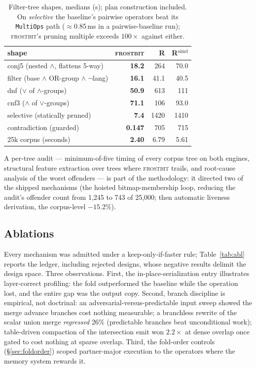 \documentclass[sigconf,nonacm]{acmart}
\newcommand{\fb}{\textsc{frostbit}}
\begin{document}
\begin{table}[t]
\caption{Filter-tree shapes, medians (\textmu s); plan construction
included. On \emph{selective} the baseline's pairwise operators beat
its \texttt{MultiOps} path ($\approx$0.85\,ms in a pairwise-baseline
run); \fb's pruning multiple exceeds $100\times$ against either.}
\label{tab:trees}
\small
\begin{tabular}{lrrr}
\toprule
shape & \fb & R & R$^{\text{simd}}$ \\
\midrule
conj5 (nested $\wedge$, flattens 5-way) & \textbf{18.2} & 264 & 70.0 \\
filter (base $\wedge$ OR-group $\wedge$ $\neg$lang) & \textbf{16.1} & 41.1 & 40.5 \\
dnf ($\vee$ of $\wedge$-groups) & \textbf{50.9} & 613 & 111 \\
cnf3 ($\wedge$ of $\vee$-groups) & \textbf{71.1} & 106 & 93.0 \\
selective (statically pruned) & \textbf{7.4} & 1420 & 1410 \\
contradiction (guarded) & \textbf{0.147} & 705 & 715 \\
25k corpus (seconds) & \textbf{2.40} & 6.79 & 5.61 \\
\bottomrule
\end{tabular}
\end{table}

A per-tree audit --- minimum-of-five timing of every corpus tree on both
engines, structural feature extraction over trees where \fb{} trails,
and root-cause analysis of the worst offenders --- is part of the
methodology: it directed two of the shipped mechanisms (the hoisted
bitmap-membership loop, reducing the audit's offender count from 1{,}245
to 743 of 25{,}000; then automatic liveness derivation, the corpus-level
$-15.2\%$).

\subsection{Ablations}
\label{sec:eval:abl}

Every mechanism was admitted under a keep-only-if-faster rule;
Table~\ref{tab:abl} reports the ledger, including rejected designs,
whose negative results delimit the design space. Three observations.
First, the in-place-serialization entry illustrates layer-correct
profiling: the fold outperformed the baseline while the operation lost,
and the entire gap was the output copy. Second, branch discipline is
empirical, not doctrinal: an adversarial-versus-predictable input sweep
showed the merge advance branches cost nothing measurable; a branchless
rewrite of the scalar union merge \emph{regressed} 26\% (predictable
branches beat unconditional work); table-driven compaction of the
intersection emit won $2.2\times$ at dense overlap once gated to cost
nothing at sparse overlap. Third, the fold-order controls
(\S\ref{sec:foldorder}) scoped partner-major execution to the operators
where the memory system rewards it.
\end{document}

